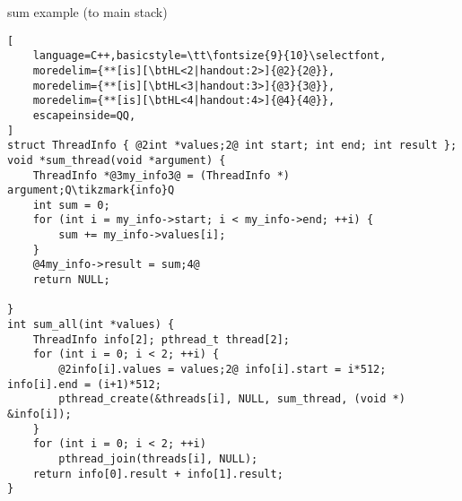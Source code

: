 \begin{frame}[fragile,label=sumNoGlobals]{sum example (to main stack)}
\begin{lstlisting}[
    language=C++,basicstyle=\tt\fontsize{9}{10}\selectfont,
    moredelim={**[is][\btHL<2|handout:2>]{@2}{2@}},
    moredelim={**[is][\btHL<3|handout:3>]{@3}{3@}},
    moredelim={**[is][\btHL<4|handout:4>]{@4}{4@}},
    escapeinside=QQ,
]
struct ThreadInfo { @2int *values;2@ int start; int end; int result };
void *sum_thread(void *argument) {
    ThreadInfo *@3my_info3@ = (ThreadInfo *) argument;Q\tikzmark{info}Q
    int sum = 0;
    for (int i = my_info->start; i < my_info->end; ++i) {
        sum += my_info->values[i];
    }
    @4my_info->result = sum;4@
    return NULL;

}
int sum_all(int *values) {
    ThreadInfo info[2]; pthread_t thread[2];
    for (int i = 0; i < 2; ++i) {
        @2info[i].values = values;2@ info[i].start = i*512; info[i].end = (i+1)*512;
        pthread_create(&threads[i], NULL, sum_thread, (void *) &info[i]);
    }
    for (int i = 0; i < 2; ++i)
        pthread_join(threads[i], NULL);
    return info[0].result + info[1].result;
}
\end{lstlisting}
\end{frame}

